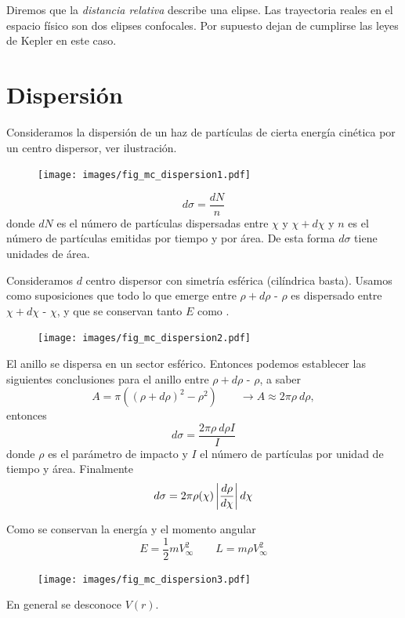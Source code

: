 \documentclass[10pt,oneside]{CBFT_book}
\begin{document}
Diremos que la {\it distancia relativa} describe una elipse. Las trayectoria reales en el espacio físico
son dos elipses confocales. Por supuesto dejan de cumplirse las leyes de Kepler en este caso.

\section{Dispersión}

Consideramos la dispersión de un haz de partículas de cierta energía cinética por un centro dispersor,
ver ilustración.
\begin{figure}[htb]
	\begin{center}
	\texttt{[image: images/fig\_mc\_dispersion1.pdf]}	 
	\end{center}
	\caption{}
\end{figure} 
\[
	d\sigma = \frac{dN}{n}
\]
donde $dN$ es el número de partículas dispersadas entre $\chi$ y $\chi + d\chi$ y $n$ es el número de
partículas emitidas por tiempo y por área. De esta forma $d\sigma$ tiene unidades de área.

Consideramos $d$ centro dispersor con simetría esférica (cilíndrica basta).
Usamos como suposiciones que todo lo que emerge entre $\rho + d\rho$ - $\rho$  es dispersado entre
$\chi + d\chi$ - $\chi$, y que se conservan tanto $E$ como .

\begin{figure}[htb]
	\begin{center}
	\texttt{[image: images/fig\_mc\_dispersion2.pdf]}	 
	\end{center}
	\caption{}
\end{figure}

El anillo se dispersa en un sector esférico. Entonces podemos establecer las siguientes conclusiones
para el anillo entre $\rho + d\rho$ - $\rho$, a saber
\[
	A =  \pi ( (\rho + d\rho)^2 - \rho^2 ) \qquad \longrightarrow A \approx 2 \pi \rho \: d\rho,
\]
entonces
\[
	d\sigma = \frac{  2 \pi \rho \: d\rho I}{I}
\]
donde $\rho$ es el parámetro de impacto y $I$ el número de partículas por unidad de tiempo y área.
Finalmente
\[
	d\sigma =  2 \pi \rho(\chi) \left| \frac{d^{\hspace{-0.05em}} {\rho}}{d {\chi}^{\hspace{-0.05em}}} \right| d\chi
\]

Como se conservan la energía y el momento angular
\[
	E = \frac{1}{2} m V_\infty^2 \qquad L = m \rho V_\infty^2 
\]
\begin{figure}[htb]
	\begin{center}
	\texttt{[image: images/fig\_mc\_dispersion3.pdf]}	 
	\end{center}
	\caption{}
\end{figure}
En general se desconoce $V(r)$.
\end{document}
